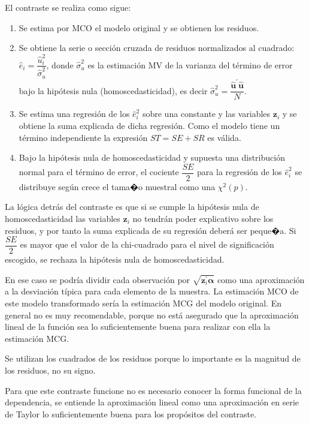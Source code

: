 El contraste se realiza como sigue:
\begin{enumerate}
\item Se estima por MCO el modelo original y se obtienen los residuos.
\item Se obtiene la serie o secci\'on cruzada de residuos normalizados al
cuadrado: $\hat{e}_{i}=\dfrac{\hat{u}_{i}^{2}}{\hat{\sigma}_{u}^{2}}$,
donde $\hat{\sigma}_{u}^{2}$ es la estimaci\'on MV de la varianza del
t\'ermino de error bajo la hip\'otesis nula (homoscedasticidad), es decir
$\hat{\sigma}_{u}^{2}=\dfrac{\hat{\boldsymbol{u}}^{\prime}\hat{\boldsymbol{u}}}{N}$.
\item Se estima una regresi\'on de los $\hat{e}_{i}^{2}$ sobre una constante
y las variables $\boldsymbol{z}_{i}$ y se obtiene la suma explicada
de dicha regresi\'on. Como el modelo tiene un t\'ermino independiente
la expresi\'on $ST=SE+SR$ es v\'alida.
\item Bajo la hip\'otesis nula de homoscedasticidad y supuesta una distribuci\'on
normal para el t\'ermino de error, el cociente $\dfrac{SE}{2}$ para
la regresi\'on de los $\hat{e}_{i}^{2}$ se distribuye seg\'un crece el
tama�o muestral como una $\chi^{2}(p)$.
\end{enumerate}
La l\'ogica detr\'as del contraste es que si se cumple la hip\'otesis nula
de homoscedasticidad las variables $\boldsymbol{z}_{i}$ no tendr\'an
poder explicativo sobre los residuos, y por tanto la suma explicada
de su regresi\'on deber\'a ser peque�a. Si $\dfrac{SE}{2}$ es mayor que
el valor de la chi-cuadrado para el nivel de significaci\'on escogido,
se rechaza la hip\'otesis nula de homoscedasticidad.

En ese caso se podr\'ia dividir cada observaci\'on por $\sqrt{\boldsymbol{z}_{i}^{\prime}\boldsymbol{\alpha}}$
como una aproximaci\'on a la desviaci\'on t\'ipica para cada elemento de
la muestra. La estimaci\'on MCO de este modelo transformado ser\'ia la
estimaci\'on MCG del modelo original. En general no es muy recomendable,
porque no est\'a asegurado que la aproximaci\'on lineal de la funci\'on
sea lo suficientemente buena para realizar con ella la estimaci\'on
MCG.

Se utilizan los cuadrados de los residuos porque lo importante es
la magnitud de los residuos, no su signo.

Para que este contraste funcione no es necesario conocer la forma
funcional de la dependencia, se entiende la aproximaci\'on lineal como
una aproximaci\'on en serie de Taylor lo suficientemente buena para
los prop\'ositos del contraste.

